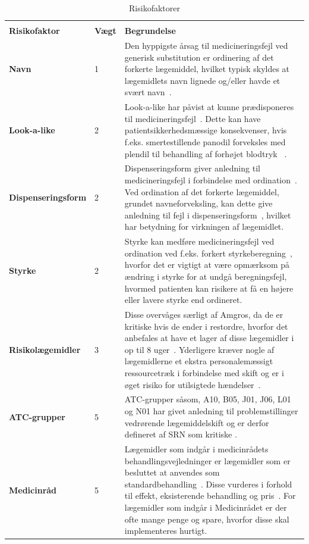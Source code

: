 \begin{longtable}{p{3.5cm}|p{1.1cm}|p{9.2cm}}
	\caption{Risikofaktorer} \vspace{0.2cm}
	\label{table:features} \\
\cellcolor[HTML]{C0C0C0} {\textbf{Risikofaktor}} & \cellcolor[HTML]{C0C0C0} {\textbf{Vægt}} & \cellcolor[HTML]{C0C0C0} {\textbf{Begrundelse}} \vspace{0.2cm} \\ \hline
\textbf{Navn} & 1 & Den hyppigste årsag til medicineringsfejl ved generisk substitution er ordinering af det forkerte lægemiddel, hvilket typisk skyldes at lægemidlets navn lignede og/eller havde et svært navn~\citep{Hakonsen2010}. \\  \hline 
\textbf{Look-a-like} & 2 & Look-a-like har påvist at kunne prædisponeres til medicineringsfejl~\citep{Wittich2014}. Dette kan have patientsikkerhedsmæssige konsekvenser, hvis f.eks. smertestillende panodil forveksles med plendil til behandling af forhøjet blodtryk ~\citep{DanskSelskabforPatientsikkerhed2009}.\\  \hline 
\textbf{Dispenseringsform} & 2 & Dispenseringsform giver anledning til medicineringsfejl i forbindelse med ordination~\citep{Agrawal2009}. Ved ordination af det forkerte lægemiddel, grundet navneforveksling, kan dette give anledning til fejl i dispenseringsform~\citep{DanskSelskabforPatientsikkerhed2009}, hvilket har betydning for virkningen af lægemidlet.
\\ \hline 
\textbf{Styrke} & 2 & Styrke kan medføre medicineringsfejl ved ordination ved f.eks. forkert styrkeberegning~\citep{Agrawal2009}, hvorfor det er vigtigt at være opmærksom på  ændring i styrke for at undgå beregningsfejl, hvormed patienten kan risikere at få en højere eller lavere styrke end ordineret.\\ \hline
\textbf{Risikolægemidler} & 3 & Disse overvåges særligt af Amgros, da de er kritiske hvis de ender i restordre, hvorfor det anbefales at have et lager af disse lægemidler i op til 8 uger~\citep{Amgros}. Yderligere kræver nogle af lægemidlerne et ekstra personalemæssigt ressourcetræk i forbindelse med skift og er i øget risiko for utilsigtede hændelser~\citep{Amgros}. \\ \hline 
\textbf{ATC-grupper} & 5 & ATC-grupper såsom, A10, B05, J01, J06, L01 og N01 har givet anledning til problemstillinger vedrørende lægemiddelskift og er derfor defineret af SRN som kritiske \citep{SRN}. \\ \hline 
\textbf{Medicinråd} & 5 & Lægemidler som indgår i medicinrådets behandlingsvejledninger er lægemidler som er besluttet at anvendes som standardbehandling~\citep{Medicinradet2018}. Disse vurderes i forhold til effekt, eksisterende behandling og pris~\citep{Medicinradet2018}. For lægemidler som indgår i Medicinrådet er der ofte mange penge og spare, hvorfor disse skal implementeres hurtigt. \\ \hline 
    \end{longtable}

